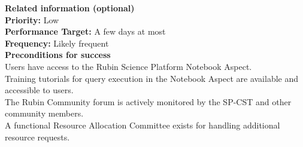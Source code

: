 \textbf{Related information (optional)} \\
\textbf{Priority:} Low \\
\textbf{Performance Target:} A few days at most \\
\textbf{Frequency:} Likely frequent \\

\textbf{Preconditions for success} \\
Users have access to the Rubin Science Platform Notebook Aspect. \\
Training tutorials for query execution in the Notebook Aspect are available and accessible to users. \\
The Rubin Community forum is actively monitored by the SP-CST and other community members. \\
A functional Resource Allocation Committee exists for handling additional resource requests.\\
